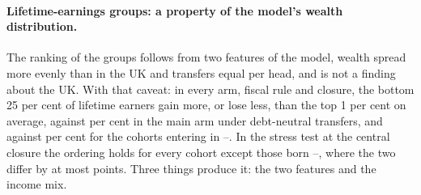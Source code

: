 \paragraph{Lifetime-earnings groups: a property of the model's wealth distribution.} The ranking of the groups follows from two features of the model, wealth spread more evenly than in the UK and transfers equal per head, and is not a finding about the UK. With that caveat: in every arm, fiscal rule and closure, the bottom 25 per cent of lifetime earners gain more, or lose less, than the top 1 per cent on average, \genCohMainDnCentralBottom{} against \genCohMainDnCentralTopOne{} per cent in the main arm under debt-neutral transfers, and \genCohMainDnCentralFutBottom{} against \genCohMainDnCentralFutTopOne{} per cent for the cohorts entering in \genCohFutFirstEntry--\genCohFutLastEntry{}. In the stress test at the central closure the ordering holds for every cohort except those born \genCohStressDnCentralRankFlipFirst--\genCohStressDnCentralRankFlipLast{}, where the two differ by at most \genCohStressDnCentralRankFlipMaxGap{} points. Three things produce it: the two features and the income mix.
